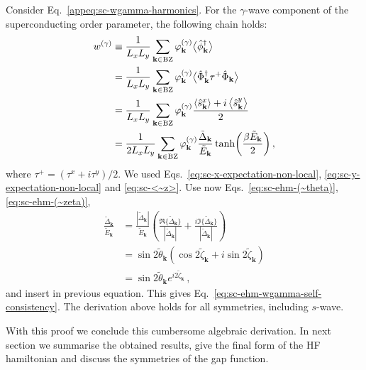 \begin{tabproof}
	
	Consider Eq.~\eqref{appeq:sc-wgamma-harmonics}. For the $\gamma$-wave component of the superconducting order parameter, the following chain holds:
	\[
	\begin{aligned}
		w^{(\gamma)} &\equiv \frac{1}{L_x L_y} \sum_{\mathbf{k}\in\mathrm{BZ}} \varphi_\mathbf{k}^{(\gamma)} \big\langle
		\hat \phi_\mathbf{k}^\dagger
		\big\rangle\\
		&= \frac{1}{L_x L_y} \sum_{\mathbf{k}\in\mathrm{BZ}} \varphi_\mathbf{k}^{(\gamma)}  \big\langle
		\hat \Phi_\mathbf{k}^\dagger \tau^+ \hat \Phi_\mathbf{k}
		\big\rangle \\
		&= \frac{1}{L_x L_y} \sum_{\mathbf{k}\in\mathrm{BZ}} \varphi_\mathbf{k}^{(\gamma)} \frac{\ev{\hat s_\mathbf{k}^x} + i \ev{\hat s_\mathbf{k}^y} }{2} \\
		&= \frac{1}{2L_x L_y} \sum_{\mathbf{k}\in\mathrm{BZ}} \varphi_\mathbf{k}^{(\gamma)} \frac{\tilde{\Delta}_\mathbf{k}}{\tilde{E}_\mathbf{k}} \tanh(\frac{\beta \tilde{E}_\mathbf{k}}{2}) \, ,
	\end{aligned}
	\]
	where $\tau^+ = (\tau^x + i \tau^y)/2$. We used Eqs.~\eqref{eq:sc-x-expectation-non-local}, \eqref{eq:sc-y-expectation-non-local} and \eqref{eq:sc-<~z>}. Use now Eqs.~\eqref{eq:sc-ehm-(~theta)}, \eqref{eq:sc-ehm-(~zeta)},
	\[
	\begin{aligned}
		\frac{\tilde{\Delta}_\mathbf{k}}{\tilde{E}_\mathbf{k}} &= \frac{|\tilde{\Delta}_\mathbf{k}|}{\tilde{E}_\mathbf{k}} \left(	
		\frac{\Re\{\tilde{\Delta}_\mathbf{k}\}}{|\tilde{\Delta}_\mathbf{k}|} + \frac{i\Im\{\tilde{\Delta}_\mathbf{k}\}}{|\tilde{\Delta}_\mathbf{k}|}
		\right)  \\
		&= \sin 2\tilde{\theta}_\mathbf{k} \left(
		\cos 2\tilde{\zeta}_\mathbf{k}  + i \sin 2\tilde{\zeta}_\mathbf{k} 
		\right) \\
		&= \sin 2\tilde{\theta}_\mathbf{k}  e^{i 2\tilde{\zeta}_\mathbf{k}} \, ,
	\end{aligned}
	\]
	and insert in previous equation. This gives Eq.~\eqref{eq:sc-ehm-wgamma-self-consistency}.
	The derivation above holds for all symmetries, including $s$-wave.
\end{tabproof}
%
With this proof we conclude this cumbersome algebraic derivation. In next section we summarise the obtained results, give the final form of the HF hamiltonian and discuss the symmetries of the gap function.

